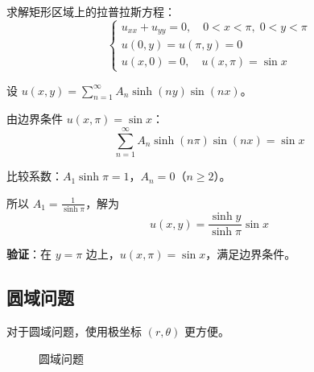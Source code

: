 \begin{lizi}{}{}
求解矩形区域上的拉普拉斯方程：
\begin{equation}
    \begin{cases}
        u_{xx} + u_{yy} = 0, \quad 0 < x < \pi, \; 0 < y < \pi \\
        u(0, y) = u(\pi, y) = 0 \\
        u(x, 0) = 0, \quad u(x, \pi) = \sin x
    \end{cases}
\end{equation}

\begin{jie}
    设 $u(x, y) = \sum_{n=1}^{\infty} A_n\sinh(ny)\sin(nx)$。

    由边界条件 $u(x, \pi) = \sin x$：
    \begin{equation}
        \sum_{n=1}^{\infty} A_n\sinh(n\pi)\sin(nx) = \sin x
    \end{equation}

    比较系数：$A_1\sinh\pi = 1$，$A_n = 0$（$n \geq 2$）。

    所以 $A_1 = \frac{1}{\sinh\pi}$，解为
    \begin{equation}
        u(x, y) = \frac{\sinh y}{\sinh\pi}\sin x
    \end{equation}

    \textbf{验证}：在 $y = \pi$ 边上，$u(x, \pi) = \sin x$，满足边界条件。
\end{jie}
\end{lizi}

\subsection{圆域问题}

对于圆域问题，使用极坐标 $(r, \theta)$ 更方便。

\begin{figure}[htbp]
\centering
{}
\caption{圆域问题}
\label{fig:circular-domain}
\end{figure}

